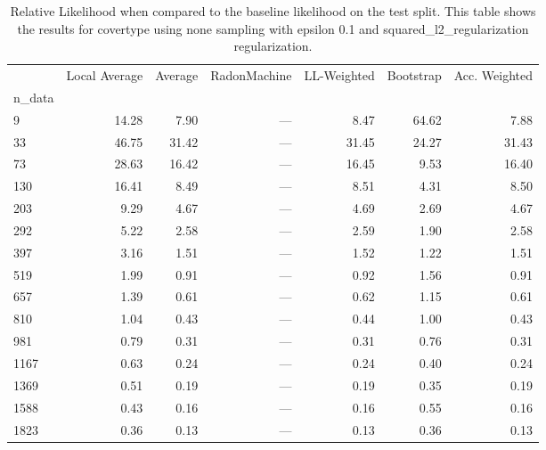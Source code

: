 \begin{table}
\centering
\caption{Relative Likelihood when compared to the baseline likelihood on the test split. This table shows the results for  covertype using  none sampling with epsilon  0.1 and  squared_l2_regularization regularization.}
\label{tab:4}
\begin{tabular}{lrrrrrr}
\toprule
{} &  Local Average &  Average &  RadonMachine &  LL-Weighted &  Bootstrap &  Acc. Weighted \\
n\_data &                &          &               &              &            &                \\
\midrule
9      &          14.28 &     7.90 &           --- &         8.47 &      64.62 &           7.88 \\
33     &          46.75 &    31.42 &           --- &        31.45 &      24.27 &          31.43 \\
73     &          28.63 &    16.42 &           --- &        16.45 &       9.53 &          16.40 \\
130    &          16.41 &     8.49 &           --- &         8.51 &       4.31 &           8.50 \\
203    &           9.29 &     4.67 &           --- &         4.69 &       2.69 &           4.67 \\
292    &           5.22 &     2.58 &           --- &         2.59 &       1.90 &           2.58 \\
397    &           3.16 &     1.51 &           --- &         1.52 &       1.22 &           1.51 \\
519    &           1.99 &     0.91 &           --- &         0.92 &       1.56 &           0.91 \\
657    &           1.39 &     0.61 &           --- &         0.62 &       1.15 &           0.61 \\
810    &           1.04 &     0.43 &           --- &         0.44 &       1.00 &           0.43 \\
981    &           0.79 &     0.31 &           --- &         0.31 &       0.76 &           0.31 \\
1167   &           0.63 &     0.24 &           --- &         0.24 &       0.40 &           0.24 \\
1369   &           0.51 &     0.19 &           --- &         0.19 &       0.35 &           0.19 \\
1588   &           0.43 &     0.16 &           --- &         0.16 &       0.55 &           0.16 \\
1823   &           0.36 &     0.13 &           --- &         0.13 &       0.36 &           0.13 \\
\bottomrule
\end{tabular}
\end{table}
